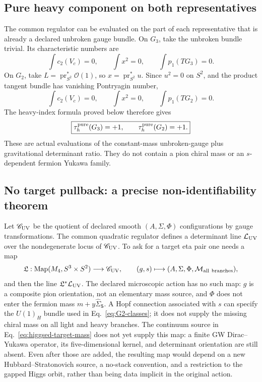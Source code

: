 \documentclass[11pt]{article}
\theoremstyle{definition}
\theoremstyle{remark}
\begin{document}
\subsection{Pure heavy component on both representatives}

The common regulator can be evaluated on the part of each representative
that is already a declared unbroken gauge bundle.  On \(G_3\), take the
unbroken bundle trivial.  Its characteristic numbers are
\begin{equation}
 \int c_2(V_c)=0,\qquad \int x^2=0,\qquad \int p_1(TG_3)=0.
 \label{eq:G3-classes}
\end{equation}
On \(G_2\), take \(L=\operatorname{pr}_{S^2}^*\mathcal O(1)\), so
\(x=\operatorname{pr}_{S^2}^*u\).  Since \(u^2=0\) on \(S^2\), and the
product tangent bundle has vanishing Pontryagin number,
\begin{equation}
 \int c_2(V_c)=0,\qquad \int x^2=0,\qquad \int p_1(TG_2)=0.
 \label{eq:G2-classes}
\end{equation}
The heavy-index formula proved below therefore gives
\begin{equation}
 \boxed{\tau_h^{\rm pure}(G_3)=+1,\qquad
        \tau_h^{\rm pure}(G_2)=+1.}
 \label{eq:pure-pair}
\end{equation}
These are actual evaluations of the constant-mass unbroken-gauge plus
gravitational determinant ratio.  They do not contain a pion chiral mass or
an \(s\)-dependent fermion Yukawa family.

\subsection{No target pullback: a precise non-identifiability theorem}

Let \(\mathscr C_{\rm UV}\) be the quotient of declared smooth
\((A,\Sigma,\Phi)\) configurations by gauge transformations.  The common
quadratic regulator defines a determinant line \(\mathcal L_{\rm UV}\) over
the nondegenerate locus of \(\mathscr C_{\rm UV}\).  To ask for a target eta
pair one needs a map
\begin{equation}
 \mathfrak L:\operatorname{Map}(M_4,S^3\times S^2)
 \longrightarrow\mathscr C_{\rm UV},
 \qquad
 (g,s)\longmapsto(A,\Sigma,\Phi,\mathcal M_{\rm all\ branches}),
 \label{eq:missing-lift}
\end{equation}
and then the line \(\mathfrak L^*\mathcal L_{\rm UV}\).  The declared
microscopic action has no such map: \(g\) is a composite pion orientation,
not an elementary mass source, and \(\Phi\) does not enter the fermion mass
\(m+y\widehat\Sigma_{\bm5}\).  A Hopf connection associated with \(s\) can
specify the \(U(1)_H\) bundle used in Eq.~\eqref{eq:G2-classes}; it does not
supply the missing chiral mass on all light and heavy branches.
The continuum source in Eq.~\eqref{eq:higgsed-target-mass} does not yet
supply this map: a finite GW Dirac--Yukawa operator, its five-dimensional
kernel, and determinant orientation are still absent.  Even after those are
added, the resulting map would depend on a new Hubbard--Stratonovich source,
a no-stack convention, and a restriction to the gapped Higgs orbit, rather
than being data implicit in the original action.
\end{document}
